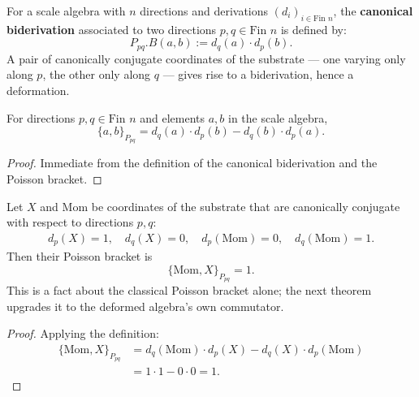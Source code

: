 \begin{definition}
For a scale algebra with $n$ directions and derivations $(d_i)_{i \in \text{Fin } n}$, the \textbf{canonical biderivation} associated to two directions $p, q \in \text{Fin } n$ is defined by:
\[
P_{pq}.B(a, b) := d_q(a) \cdot d_p(b) .
\]
A pair of canonically conjugate coordinates of the substrate — one varying only along $p$, the other only along $q$ — gives rise to a biderivation, hence a deformation.
\end{definition}

\begin{theorem}
For directions $p, q \in \text{Fin } n$ and elements $a, b$ in the scale algebra,
\[
\{a, b\}_{P_{pq}} = d_q(a) \cdot d_p(b) - d_q(b) \cdot d_p(a) .
\]
\begin{proof}
Immediate from the definition of the canonical biderivation and the Poisson bracket.
\end{proof}
\end{theorem}

\begin{theorem}
Let $X$ and $\text{Mom}$ be coordinates of the substrate that are canonically conjugate with respect to directions $p, q$:
\begin{align}
d_p(X) = 1, \quad d_q(X) = 0, \quad d_p(\text{Mom}) = 0, \quad d_q(\text{Mom}) = 1 .
\end{align}
Then their Poisson bracket is
\[
\{\text{Mom}, X\}_{P_{pq}} = 1 .
\]
This is a fact about the classical Poisson bracket alone; the next theorem upgrades it to the deformed algebra's own commutator.
\begin{proof}
Applying the definition:
\begin{align}
\{\text{Mom}, X\}_{P_{pq}} &= d_q(\text{Mom}) \cdot d_p(X) - d_q(X) \cdot d_p(\text{Mom}) \\
&= 1 \cdot 1 - 0 \cdot 0 = 1 .
\end{align}
\end{proof}
\end{theorem}

